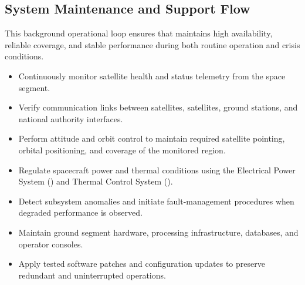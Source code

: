 \subsection{System Maintenance and Support Flow}

This background operational loop ensures that  maintains high availability, reliable coverage, and stable performance during both routine operation and crisis conditions.

\begin{itemize}
    \item Continuously monitor satellite health and status telemetry from the space segment.
    \item Verify communication links between  satellites,  satellites, ground stations, and national authority interfaces.
    \item Perform attitude and orbit control to maintain required satellite pointing, orbital positioning, and coverage of the monitored region.
    \item Regulate spacecraft power and thermal conditions using the Electrical Power System () and Thermal Control System ().
    \item Detect subsystem anomalies and initiate fault-management procedures when degraded performance is observed.
    \item Maintain ground segment hardware, processing infrastructure, databases, and operator consoles.
    \item Apply tested software patches and configuration updates to preserve redundant and uninterrupted operations.
\end{itemize}